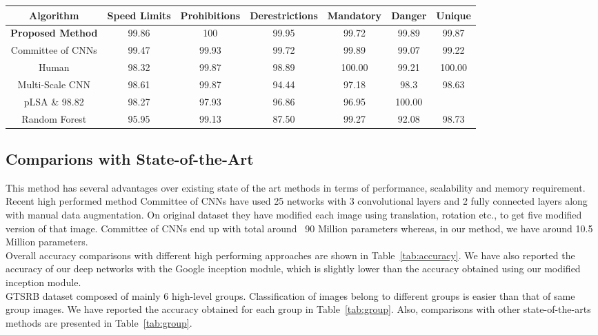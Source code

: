 \documentclass[conference]{IEEEtran}
\begin{document}
\begin{table*}[t]
\caption{Comparions of groups accuracy (Top-1) with state-of-the-arts}
\label{tab:group}
  \centering
  \begin{tabular}{|c|c|c|c|c|c|c|}
\hline
 Algorithm & Speed Limits & Prohibitions & Derestrictions & Mandatory & Danger & Unique\\
 \hline
 \hline
\textbf{Proposed Method} & 99.86 & 100 & 99.95 & 99.72 & 99.89 & 99.87\\
\hline
Committee of CNNs \cite{committe} & 99.47 & 99.93 & 99.72 &99.89& 99.07 & 99.22\\
\hline
Human \cite{gtsrb} & 98.32 & 99.87 & 98.89 & 100.00 & 99.21 & 100.00\\
\hline
Multi-Scale CNN \cite{multi} & 98.61 & 99.87 & 94.44 & 97.18 & 98.3 & 98.63\\
\hline
pLSA \cite{plsa} \& 98.82 & 98.27 & 97.93 & 96.86 & 96.95 & 100.00\\
\hline
Random Forest \cite{rf} & 95.95 & 99.13 & 87.50 & 99.27 & 92.08 & 98.73\\
\hline
 \end{tabular}
\end{table*}


\subsection{Comparions with State-of-the-Art}
This method has several advantages over existing state of the art methods in terms of performance, scalability and memory requirement. Recent high performed method Committee of CNNs\cite{committe} have used 25 networks with 3 convolutional layers and 2 fully connected layers along with manual data augmentation. On original dataset they have modified each image using translation, rotation etc., to get five modified version of that image. Committee of CNNs end up with total around ~90 Million parameters whereas, in our method, we have around 10.5 Million parameters. \\
 Overall accuracy comparisons with different high performing approaches are shown in Table~\ref{tab:accuracy}. We have also reported the accuracy of our deep networks with the Google inception module, which is slightly lower than the accuracy obtained using our modified inception module.\\
GTSRB dataset composed of mainly 6 high-level groups. Classification of images belong to different groups is easier than that of same group images. We have reported the accuracy obtained for each group in Table~\ref{tab:group}. Also, comparisons with other state-of-the-arts methods are presented in Table~\ref{tab:group}.  
\end{document}
